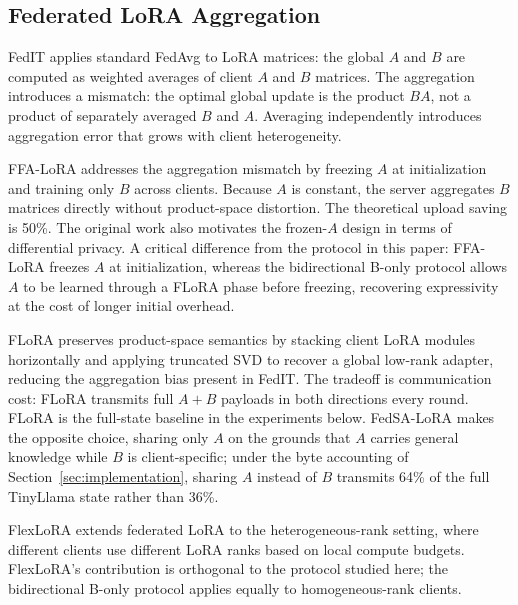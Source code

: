 \subsection{Federated LoRA Aggregation}
FedIT \cite{zhang2024federatedgpt} applies standard FedAvg \cite{mcmahan2017communication} to LoRA matrices: the global $A$ and $B$ are computed as weighted averages of client $A$ and $B$ matrices. The aggregation introduces a mismatch: the optimal global update is the product $BA$, not a product of separately averaged $B$ and $A$. Averaging independently introduces aggregation error that grows with client heterogeneity.

FFA-LoRA \cite{sun2024ffalora} addresses the aggregation mismatch by freezing $A$ at initialization and training only $B$ across clients. Because $A$ is constant, the server aggregates $B$ matrices directly without product-space distortion. The theoretical upload saving is 50\%. The original work also motivates the frozen-$A$ design in terms of differential privacy. A critical difference from the protocol in this paper: FFA-LoRA freezes $A$ at initialization, whereas the bidirectional B-only protocol allows $A$ to be learned through a FLoRA phase before freezing, recovering expressivity at the cost of longer initial overhead.

FLoRA \cite{wang2024flora} preserves product-space semantics by stacking client LoRA modules horizontally and applying truncated SVD to recover a global low-rank adapter, reducing the aggregation bias present in FedIT. The tradeoff is communication cost: FLoRA transmits full $A{+}B$ payloads in both directions every round. FLoRA is the full-state baseline in the experiments below. FedSA-LoRA \cite{guo2025fedsalora} makes the opposite choice, sharing only $A$ on the grounds that $A$ carries general knowledge while $B$ is client-specific; under the byte accounting of Section~\ref{sec:implementation}, sharing $A$ instead of $B$ transmits 64\% of the full TinyLlama state rather than 36\%.

FlexLoRA \cite{bai2024flexlora} extends federated LoRA to the heterogeneous-rank setting, where different clients use different LoRA ranks based on local compute budgets. FlexLoRA's contribution is orthogonal to the protocol studied here; the bidirectional B-only protocol applies equally to homogeneous-rank clients.

